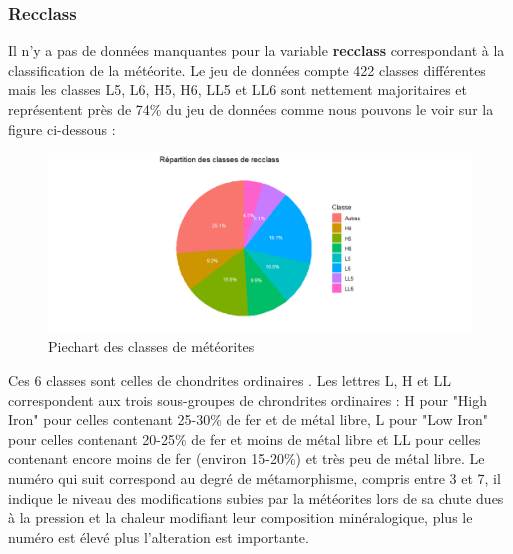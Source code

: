 \documentclass[12pt]{article}
\begin{document}
\subsubsection*{Recclass}
Il n'y a pas de données manquantes pour la variable \textbf{recclass} correspondant à la classification de la météorite. Le jeu de données compte 422 classes différentes mais les classes L5, L6, H5, H6, LL5 et LL6 sont nettement majoritaires et représentent près de 74\% du jeu de données comme nous pouvons le voir sur la figure ci-dessous :
\begin{figure}[H]
\centering
\includegraphics[width=17cm]{Images/exploration/recclass_piechart_class.png}
\caption{Piechart des classes de météorites}
\end{figure}
Ces 6 classes sont celles de chondrites ordinaires \cite{Classification_meteorites}. Les lettres L, H et LL correspondent aux trois sous-groupes de chrondrites ordinaires : H pour "High Iron" pour celles contenant 25-30\% de fer et de métal libre, L pour "Low Iron" pour celles contenant 20-25\% de fer et moins de métal libre et LL pour celles contenant encore moins de fer (environ 15-20\%) et très peu de métal libre. Le numéro qui suit correspond au degré de métamorphisme, compris entre 3 et 7, il indique le niveau des modifications subies par la météorites lors de sa chute dues à la pression et la chaleur modifiant leur composition minéralogique, plus le numéro est élevé plus l'alteration est importante.
\end{document}
